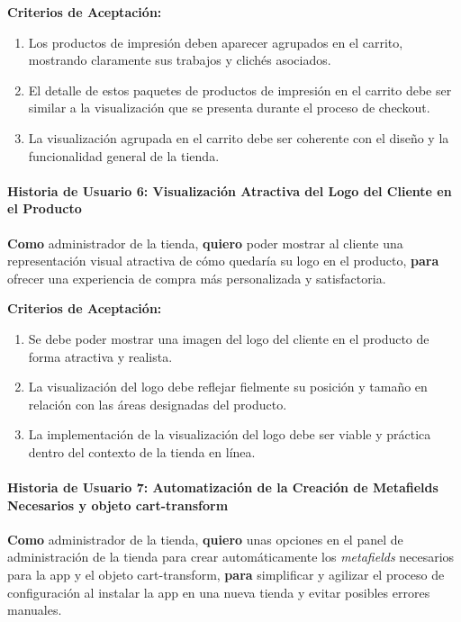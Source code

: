 \documentclass[12pt]{article}
\newcommand{\subsubsubsection}[1]{\paragraph{#1}}
\begin{document}
\vspace{0.5cm}
\textbf{Criterios de Aceptación:}
\begin{enumerate}[label=\arabic*.]
    \item Los productos de impresión deben aparecer agrupados en el carrito, mostrando claramente sus trabajos y clichés asociados.
    \item El detalle de estos paquetes de productos de impresión en el carrito debe ser similar a la visualización que se presenta durante el proceso de checkout.
    \item La visualización agrupada en el carrito debe ser coherente con el diseño y la funcionalidad general de la tienda.
\end{enumerate}


\subsubsubsection{Historia de Usuario 6: Visualización Atractiva del Logo del Cliente en el Producto}\label{sec:historia6}

\textbf{Como} administrador de la tienda,
\textbf{quiero} poder mostrar al cliente una representación visual atractiva de cómo quedaría su logo en el producto,
\textbf{para} ofrecer una experiencia de compra más personalizada y satisfactoria.

\vspace{0.5cm}
\textbf{Criterios de Aceptación:}
\begin{enumerate}[label=\arabic*.]
    \item Se debe poder mostrar una imagen del logo del cliente en el producto de forma atractiva y realista.
    \item La visualización del logo debe reflejar fielmente su posición y tamaño en relación con las áreas designadas del producto.
    \item La implementación de la visualización del logo debe ser viable y práctica dentro del contexto de la tienda en línea.
\end{enumerate}


\subsubsubsection{Historia de Usuario 7: Automatización de la Creación de Metafields Necesarios y objeto cart-transform}\label{sec:historia7}

\textbf{Como} administrador de la tienda,
\textbf{quiero} unas opciones en el panel de administración de la tienda para crear automáticamente los \textit{metafields} necesarios para la app y el objeto cart-transform,
\textbf{para} simplificar y agilizar el proceso de configuración al instalar la app en una nueva tienda y evitar posibles errores manuales.
\end{document}
